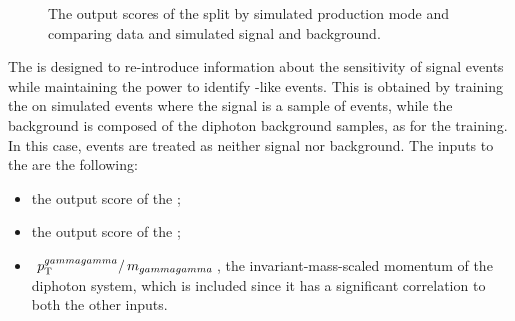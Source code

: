 \begin{figure}[h]
\centering
\caption{The output scores of the \DiJetBdt split by simulated production mode and comparing data and simulated signal and background.}
\label{fig:cat:dijet_bdt}
\end{figure}

The \DiPhoDiJetBdt is designed to re-introduce information about the sensitivity of signal events while maintaining the power to identify \VBF-like events. This is obtained by training the \BDT on simulated events where the signal is a sample of \VBF \Hgg events, while the background is composed of the \SM diphoton background samples, as for the \DiJetBdt training. In this case, \ggH events are treated as neither signal nor background. The inputs to the \BDT are the following:
\begin{itemize}
\item the output score of the \DiPhoBdt;
\item the output score of the \DiJetBdt;
\item $\,p_\text{T}^{gammagamma}/\,m_{gammagamma}$, the invariant-mass-scaled momentum of the diphoton system, which is included since it has a significant correlation to both the other inputs.
\end{itemize}

